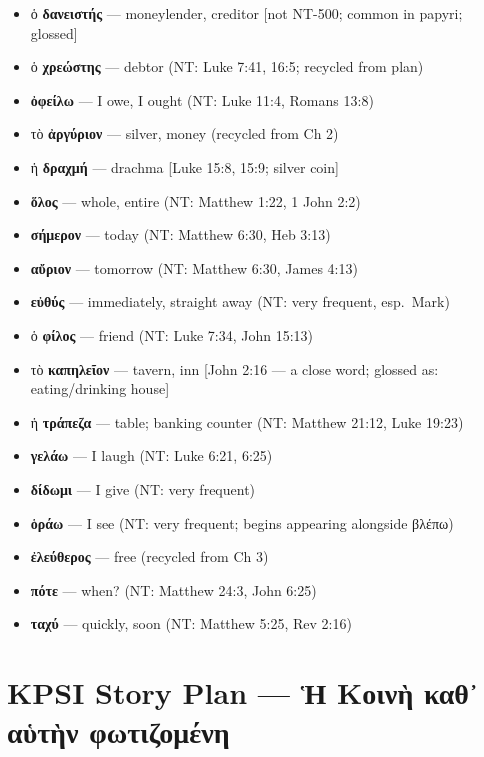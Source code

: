 \documentclass[a4paper]{report}
\begin{document}
\begin{itemize}
\tightlist
\item
  ὁ \textbf{δανειστής} --- moneylender, creditor {[}not NT-500; common
  in papyri; glossed{]}
\item
  ὁ \textbf{χρεώστης} --- debtor (NT: Luke 7:41, 16:5; recycled from
  plan)
\item
  \textbf{ὀφείλω} --- I owe, I ought (NT: Luke 11:4, Romans 13:8)
\item
  τὸ \textbf{ἀργύριον} --- silver, money (recycled from Ch 2)
\item
  ἡ \textbf{δραχμή} --- drachma {[}Luke 15:8, 15:9; silver coin{]}
\item
  \textbf{ὅλος} --- whole, entire (NT: Matthew 1:22, 1 John 2:2)
\item
  \textbf{σήμερον} --- today (NT: Matthew 6:30, Heb 3:13)
\item
  \textbf{αὔριον} --- tomorrow (NT: Matthew 6:30, James 4:13)
\item
  \textbf{εὐθύς} --- immediately, straight away (NT: very frequent,
  esp.~Mark)
\item
  ὁ \textbf{φίλος} --- friend (NT: Luke 7:34, John 15:13)
\item
  τὸ \textbf{καπηλεῖον} --- tavern, inn {[}John 2:16 --- a close word;
  glossed as: eating/drinking house{]}
\item
  ἡ \textbf{τράπεζα} --- table; banking counter (NT: Matthew 21:12, Luke
  19:23)
\item
  \textbf{γελάω} --- I laugh (NT: Luke 6:21, 6:25)
\item
  \textbf{δίδωμι} --- I give (NT: very frequent)
\item
  \textbf{ὁράω} --- I see (NT: very frequent; begins appearing alongside
  βλέπω)
\item
  \textbf{ἐλεύθερος} --- free (recycled from Ch 3)
\item
  \textbf{πότε} --- when? (NT: Matthew 24:3, John 6:25)
\item
  \textbf{ταχύ} --- quickly, soon (NT: Matthew 5:25, Rev 2:16)
\end{itemize}

\section{KPSI Story Plan --- Ἡ Κοινὴ καθ᾿ αὑτὴν
φωτιζομένη}\label{kpsi-story-plan-ux1f21-ux3baux3bfux3b9ux3bdux1f74-ux3baux3b1ux3b8-ux3b1ux1f51ux3c4ux1f74ux3bd-ux3c6ux3c9ux3c4ux3b9ux3b6ux3bfux3bcux3adux3bdux3b7}
\end{document}
